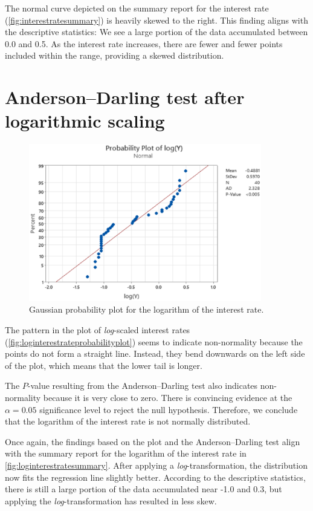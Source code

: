\documentclass[12pt]{article}
\begin{document}
The normal curve depicted on the summary report for the interest rate (\autoref{fig:interestratesummary}) is heavily skewed to the right. This finding aligns with the descriptive statistics: We see a large portion of the data accumulated between 0.0 and 0.5. As the interest rate increases, there are fewer and fewer points included within the range, providing a skewed distribution.
\section{Anderson--Darling test after logarithmic scaling}
\begin{figure}[h]
\begin{center}
\includegraphics[width=4in]{images/log-interest-rate-probability-plot.png}
\end{center}
\caption{Gaussian probability plot for the logarithm of the interest rate. \label{fig:loginterestrateprobabilityplot}}
\end{figure}
The pattern in the plot of \textit{log}-scaled interest rates (\autoref{fig:loginterestrateprobabilityplot}) seems to indicate non-normality because the points do not form a straight line. Instead, they bend downwards on the left side of the plot, which means that the lower tail is longer.

The $P$-value resulting from the Anderson--Darling test also indicates non-normality because it is very close to zero. There is convincing evidence at the $\alpha=0.05$ significance level to reject the null hypothesis. Therefore, we conclude that the logarithm of the interest rate is not normally distributed.

Once again, the findings based on the plot and the Anderson--Darling test align with the summary report for the logarithm of the interest rate in \autoref{fig:loginterestratesummary}. After applying a \textit{log}-transformation, the distribution now fits the regression line slightly better. According to the descriptive statistics, there is still a large portion of the data accumulated near -1.0 and 0.3, but applying the \textit{log}-transformation has resulted in less skew.
\end{document}
